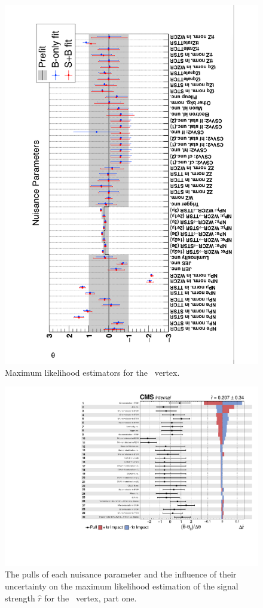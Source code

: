 \begin{figure}
	\centering
	\includegraphics[width=1.\linewidth]{6_Search/Figures/impact/171102ZutMLE.pdf}
	\caption{Maximum likelihood estimators for the \Zut\ vertex.}
	\label{fig:171102zutmle}
\end{figure}
\newpage
\begin{figure}[htbp] 
	\centering
	  \includegraphics[page=1,width=.99\linewidth,keepaspectratio]{6_Search/Figures/impact/171102Zut.pdf}
	\caption{The pulls of each nuisance parameter and the influence of their uncertainty on the maximum likelihood estimation of the signal strength $\hat{r}$ for the \Zut\ vertex, part one.}
	\label{fig:impactsZut1}
\end{figure}

